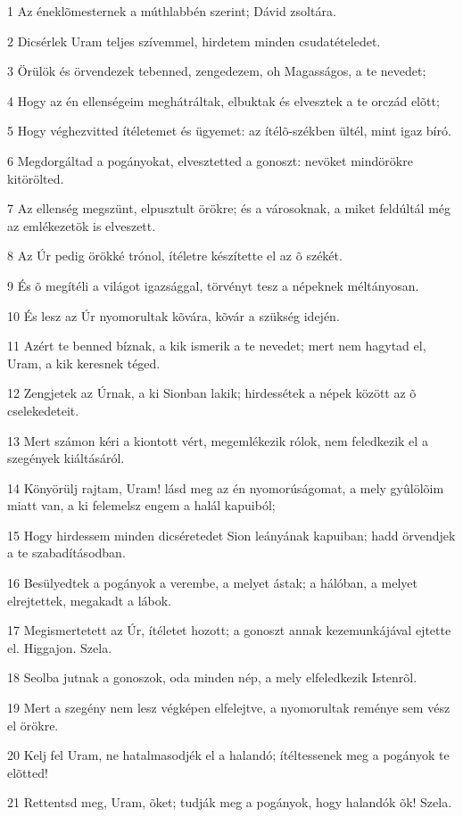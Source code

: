 \par 1 Az éneklõmesternek a múthlabbén szerint; Dávid zsoltára.
\par 2 Dicsérlek Uram teljes szívemmel, hirdetem minden csudatételedet.
\par 3 Örülök és örvendezek tebenned, zengedezem, oh Magasságos, a te nevedet;
\par 4 Hogy az én ellenségeim meghátráltak, elbuktak és elvesztek a te orczád elõtt;
\par 5 Hogy véghezvitted ítéletemet és ügyemet: az ítélõ-székben ültél, mint igaz bíró.
\par 6 Megdorgáltad a pogányokat, elvesztetted a gonoszt: nevöket mindörökre kitörölted.
\par 7 Az ellenség megszünt, elpusztult örökre; és a városoknak, a miket feldúltál még az emlékezetök is elveszett.
\par 8 Az Úr pedig örökké trónol, ítéletre készítette el az õ székét.
\par 9 És õ megítéli a világot igazsággal, törvényt tesz a népeknek méltányosan.
\par 10 És lesz az Úr nyomorultak kõvára, kõvár a szükség idején.
\par 11 Azért te benned bíznak, a kik ismerik a te nevedet; mert nem hagytad el, Uram, a kik keresnek téged.
\par 12 Zengjetek az Úrnak, a ki Sionban lakik; hirdessétek a népek között az õ cselekedeteit.
\par 13 Mert számon kéri a kiontott vért, megemlékezik rólok, nem feledkezik el a szegények kiáltásáról.
\par 14 Könyörülj rajtam, Uram! lásd meg az én nyomorúságomat, a mely gyûlölõim miatt van, a ki felemelsz engem a halál kapuiból;
\par 15 Hogy hirdessem minden dicséretedet Sion leányának kapuiban; hadd örvendjek a te szabadításodban.
\par 16 Besülyedtek a pogányok a verembe, a melyet ástak; a hálóban, a melyet elrejtettek, megakadt a lábok.
\par 17 Megismertetett az Úr, ítéletet hozott; a gonoszt annak kezemunkájával ejtette el. Higgajon. Szela.
\par 18 Seolba jutnak a gonoszok, oda minden nép, a mely elfeledkezik Istenrõl.
\par 19 Mert a szegény nem lesz végképen elfelejtve, a nyomorultak reménye sem vész el örökre.
\par 20 Kelj fel Uram, ne hatalmasodjék el a halandó; ítéltessenek meg a pogányok te elõtted!
\par 21 Rettentsd meg, Uram, õket; tudják meg a pogányok, hogy halandók õk! Szela.

